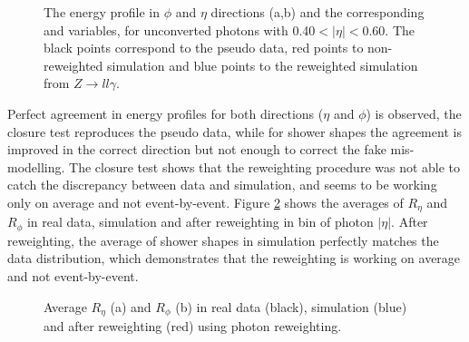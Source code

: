 \begin{figure}[htbp]
	\begin{tcolorbox}[colback=black!5!white,colframe=white!75!black]
    \caption{The energy profile in $\phi$ and $\eta$ directions (a,b) and the corresponding \Rphi and \Reta variables, for unconverted photons with 0.40$<|\eta|<$0.60. The black points correspond to the pseudo data, red points to non-reweighted simulation and blue points to the reweighted simulation from $Z\rightarrow ll\gamma$.}
    \label{fig:gamma:ss:reweighting:photon:closure}
    \end{tcolorbox}
    
\end{figure}
Perfect agreement in energy profiles for both directions ($\eta$ and $\phi$) is observed, the closure test reproduces the pseudo data, while for shower shapes the agreement is improved in the correct direction but not enough to correct the fake mis-modelling. The closure test shows that the reweighting procedure was not able to catch the discrepancy between data and simulation, and seems to be working only on average and not event-by-event. Figure \ref{fig:gamma:ss:reweighting:photon:closure:avg} shows the averages of $R_{\eta}$ and $R_{\phi}$ in real data, simulation and after reweighting in bin of photon $|\eta|$. After reweighting, the average of shower shapes in simulation perfectly matches the data distribution, which demonstrates that the reweighting is working on average and not event-by-event.

\begin{figure}[htbp]
    \centering
    \begin{tcolorbox}[colback=black!5!white,colframe=white!75!black]
    \caption{Average $R_{\eta}$ (a) and $R_{\phi}$ (b) in real data (black), simulation (blue) and after reweighting (red) using photon reweighting.}
    \label{fig:gamma:ss:reweighting:photon:closure:avg}
    \end{tcolorbox}
\end{figure}

